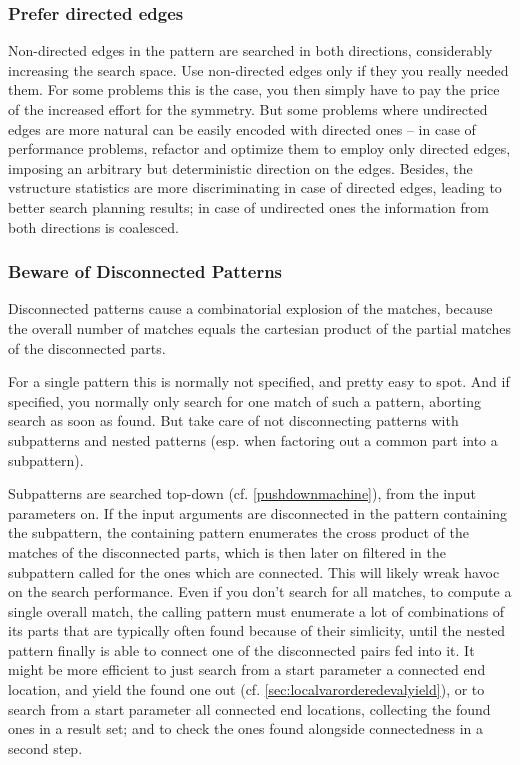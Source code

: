 \subsubsection*{Prefer directed edges}
Non-directed edges in the pattern are searched in both directions, considerably increasing the search space.
Use non-directed edges only if they you really needed them.
For some problems this is the case, you then simply have to pay the price of the increased effort for the symmetry.
But some problems where undirected edges are more natural can be easily encoded with directed ones -- in case of performance problems, refactor and optimize them to employ only directed edges, imposing an arbitrary but deterministic direction on the edges.
Besides, the vstructure statistics are more discriminating in case of directed edges, leading to better search planning results; in case of undirected ones the information from both directions is coalesced.

\subsubsection*{Beware of Disconnected Patterns}
Disconnected patterns cause a combinatorial explosion of the matches, because the overall number of matches equals the cartesian product of the partial matches of the disconnected parts. 

For a single pattern this is normally not specified, and pretty easy to spot.
And if specified, you normally only search for one match of such a pattern, aborting search as soon as found.
But take care of not disconnecting patterns with subpatterns and nested patterns (esp. when factoring out a common part into a subpattern).

Subpatterns are searched top-down (cf. \ref{pushdownmachine}), from the input parameters on.
If the input arguments are disconnected in the pattern containing the subpattern, the containing pattern enumerates the cross product of the matches of the disconnected parts, which is then later on filtered in the subpattern called for the ones which are connected.
This will likely wreak havoc on the search performance.
Even if you don't search for all matches, to compute a single overall match, the calling pattern must enumerate a lot of combinations of its parts that are typically often found because of their simlicity, until the nested pattern finally is able to connect one of the disconnected pairs fed into it.
It might be more efficient to just search from a start parameter a connected end location, and yield the found one out (cf. \ref{sec:localvarorderedevalyield}), or to search from a start parameter all connected end locations, collecting the found ones in a result set; and to check the ones found alongside connectedness in a second step.

